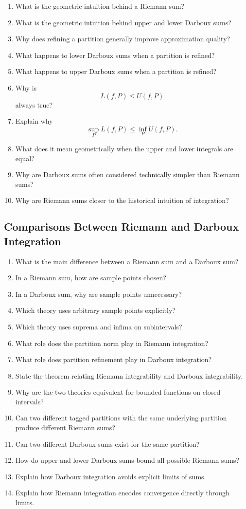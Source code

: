 \begin{enumerate}[resume]
  \item What is the geometric intuition behind a Riemann sum?
  \item What is the geometric intuition behind upper and lower Darboux sums?
  \item Why does refining a partition generally improve approximation quality?
  \item What happens to lower Darboux sums when a partition is refined?
  \item What happens to upper Darboux sums when a partition is refined?
  \item Why is
    \[ L(f,P) \le U(f,P) \]
    always true?
  \item Explain why
    \[ \sup_{P} L(f,P) \le \inf_{P} U(f,P). \]
  \item What does it mean geometrically when the upper and lower integrals are equal?
  \item Why are Darboux sums often considered technically simpler than Riemann sums?
  \item Why are Riemann sums closer to the historical intuition of integration?
\end{enumerate}

\subsection{Comparisons Between Riemann and Darboux Integration}

\begin{enumerate}[resume]
  \item What is the main difference between a Riemann sum and a Darboux sum?
  \item In a Riemann sum, how are sample points chosen?
  \item In a Darboux sum, why are sample points unnecessary?
  \item Which theory uses arbitrary sample points explicitly?
  \item Which theory uses suprema and infima on subintervals?
  \item What role does the partition norm play in Riemann integration?
  \item What role does partition refinement play in Darboux integration?
  \item State the theorem relating Riemann integrability and Darboux integrability.
  \item Why are the two theories equivalent for bounded functions on closed intervals?
  \item Can two different tagged partitions with the same underlying partition produce different Riemann sums?
  \item Can two different Darboux sums exist for the same partition?
  \item How do upper and lower Darboux sums bound all possible Riemann sums?
  \item Explain how Darboux integration avoids explicit limits of sums.
  \item Explain how Riemann integration encodes convergence directly through limits.
\end{enumerate}

